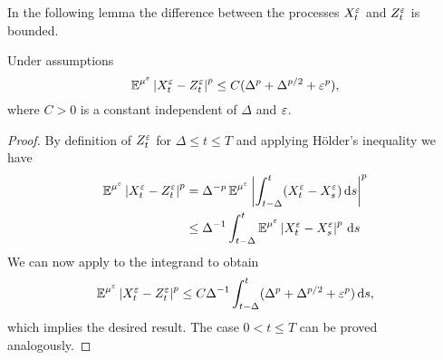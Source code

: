 \documentclass[10pt]{article}
\begin{document}
In the following lemma the difference between the processes $X_t^\varepsilon$ and $Z_t^\varepsilon$ is bounded. 
\begin{lemma}\label{lem:BoundDiffCont} Under assumptions 
	\begin{equation}
		\operatorname{\mathbb{E}}^{\mu^\varepsilon} \left\lvert X_t^\varepsilon - Z_t^\varepsilon\right\rvert^p \leq C (\Delta^p + \Delta^{p/2} + \varepsilon^p),
	\end{equation}
	where $C > 0$ is a constant independent of $\Delta$ and $\varepsilon$.
\end{lemma}
\begin{proof} By definition of $Z_t^\varepsilon$ for $\Delta \leq t \leq T$ and applying Hölder's inequality we have
	\begin{equation}
	\begin{aligned}
		\operatorname{\mathbb{E}}^{\mu^\varepsilon} \left\lvert X_t^\varepsilon - Z_t^\varepsilon\right\rvert^p &= \Delta^{-p} \operatorname{\mathbb{E}}^{\mu^\varepsilon} \left\lvert\int_{t-\Delta}^t (X_t^\varepsilon - X_s^\varepsilon) \,\mathrm{d} s\right\rvert^p \\
		&\leq \Delta^{-1} \int_{t-\Delta}^t  \operatorname{\mathbb{E}}^{\mu^\varepsilon} \left\lvert X_t^\varepsilon - X_s^\varepsilon\right\rvert^p \,\mathrm{d} s
	\end{aligned}
	\end{equation}
	We can now apply \cite[Lemma 6.1]{PaS07} to the integrand to obtain
	\begin{equation}
		\operatorname{\mathbb{E}}^{\mu^\varepsilon} \left\lvert X_t^\varepsilon - Z_t^\varepsilon\right\rvert^p \leq C\Delta^{-1} \int_{t-\Delta}^t (\Delta^p + \Delta^{p/2} + \varepsilon^p) \,\mathrm{d} s,
	\end{equation}
	which implies the desired result. The case $0 < t \leq T$ can be proved analogously.
\end{proof}
\end{document}

